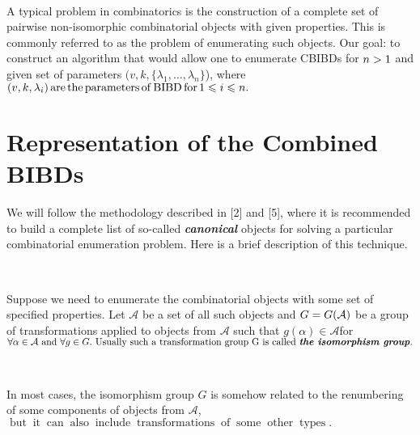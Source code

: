 \documentclass{article}
\newcommand{\infixand}{\text{ and }}
\newcommand{\tmem}[1]{{\em #1\/}}
\newcommand{\tmop}[1]{\ensuremath{\operatorname{#1}}}
\newcommand{\tmstrong}[1]{\textbf{#1}}
\newenvironment{tmparmod}[3]{\begin{list}{}{\setlength{\topsep}{0pt}\setlength{\leftmargin}{#1}\setlength{\rightmargin}{#2}\setlength{\parindent}{#3}\setlength{\listparindent}{\parindent}\setlength{\itemindent}{\parindent}\setlength{\parsep}{\parskip}} \item[]}{\end{list}}
\begin{document}
\paragraph{}

\begin{tmparmod}{0pt}{0pt}{0tab}%
  A typical problem in combinatorics is the construction of a complete set of
  pairwise non-isomorphic combinatorial objects with given properties. This is
  commonly referred to as the problem of enumerating such objects. Our goal:
  to construct an algorithm that would allow one to enumerate CBIBDs for $n >
  {\nobreak} 1$ and given set of parameters $(v, k, \{ \lambda_1, \ldots,
  \lambda_n \}$), where $(v, k, \lambda_i) \tmop{are} \tmop{the}
  \tmop{parameters} \tmop{of} \tmop{BIBD} \tmop{for} 1 \leqslant {\nobreak} i
  \leqslant {\nobreak} n.$
\end{tmparmod}

\section{Representation of the Combined BIBDs}

We will follow the methodology described in [2] and [5], where it is
recommended to build a complete list of so-called
{\tmstrong{{\tmem{canonical}} }}objects for solving a particular combinatorial
enumeration problem. Here is a brief description of this technique.

\

\begin{tmparmod}{0pt}{0pt}{0tab}%
  Suppose we need to enumerate the combinatorial objects with some set of
  specified properties. Let \ensuremath{\mathcal{A}} be a set of all such
  objects and $G = {\nobreak} G (\mathcal{A})$ be a group of transformations
  applied to objects from \ensuremath{\mathcal{A}} such that $g (\alpha) \in
  \mathcal{A}$for $\forall \alpha \in {\nobreak} \mathcal{A} \infixand \forall
  g \in G. \text{ Usually such a transformation group G is called
  {\tmem{{\tmstrong{the isomorphism group}}}}} .$
\end{tmparmod}

\

\begin{tmparmod}{0pt}{0pt}{0tab}%
  In most cases, the isomorphism group $G$ is somehow related to the
  renumbering of some components of objects from \ensuremath{\mathcal{A}},
  $\tmop{but} \tmop{it} \tmop{can} \tmop{also} \tmop{include}
  \tmop{transformations} \tmop{of} \tmop{some} \tmop{other} \tmop{types} .$
\end{tmparmod}
\end{document}
